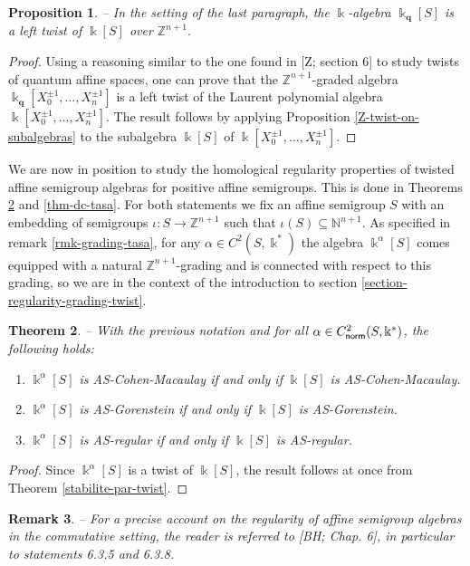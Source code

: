 \documentclass[twoside,11pt]{article}
\newcommand{\norm}{{\sf norm}}
\renewcommand{\k}{\Bbbk}
\newcommand{\N}{{\mathbb N}}
\newcommand{\Z}{{\mathbb Z}}
\newcommand{\q}{{\mathbf q}}
\newtheorem{subtheorem}{Theorem}[subsection]
\newtheorem{subproposition}[subtheorem]{Proposition}
\newtheorem{subremark}[subtheorem]{Remark}
\begin{document}
\begin{subproposition} -- \label{tasa-est-un-zt}
In the setting of the last paragraph, the $\k$-algebra $\k_\q[S]$ is a left twist of
$\k[S]$ over $\Z^{n+1}$.
\end{subproposition}

\begin{proof}  
Using a reasoning similar to the one found in [Z; section 6] to study twists of quantum
affine spaces, one can prove that the $\Z^{n+1}$-graded algebra $\k_\q[X_0^{\pm 1},
\ldots, X_n^{\pm 1}]$ is a left twist of the Laurent polynomial algebra $\k[X_0^{\pm 1},
\ldots, X_n^{\pm 1}]$. The result follows by applying Proposition
\ref{Z-twist-on-subalgebras} to the subalgebra $\k[S]$ of $\k[X_0^{\pm 1}, \ldots,
X_n^{\pm 1}]$. \end{proof}

We are now in position to study the homological regularity properties of twisted affine
semigroup algebras for positive affine semigroups. This is done in Theorems
\ref{thm-AS-tasa} and \ref{thm-dc-tasa}. For both statements we fix an affine semigroup
$S$ with an embedding of semigroups $\iota : S \longrightarrow \Z^{n+1}$ such that
$\iota(S) \subseteq \N^{n+1}$. As specified in remark \ref{rmk-grading-tasa}, for
any $\alpha\in C^2(S,\k^*)$ the algebra $\k^\alpha[S]$ comes equipped with a natural
$\Z^{n+1}$-grading and is connected with respect to this grading, so we are in the context
of the introduction to section \ref{section-regularity-grading-twist}.

\begin{subtheorem} -- \label{thm-AS-tasa} 
With the previous notation and for all $\alpha \in C^2_\norm(S,\k^*)$, the following
holds:
\begin{enumerate}
	\item $\k^\alpha[S]$ is AS-Cohen-Macaulay if and only if $\k[S]$ is
		AS-Cohen-Macaulay.
	\item $\k^\alpha[S]$ is AS-Gorenstein if and only if $\k[S]$ is AS-Gorenstein.
	\item $\k^\alpha[S]$ is AS-regular if and only if $\k[S]$ is AS-regular.
\end{enumerate}
\end{subtheorem}

\begin{proof} Since $\k^\alpha[S]$ is a twist of $\k[S]$, the result follows at once from
Theorem \ref{stabilite-par-twist}. \end{proof}

\begin{subremark} -- \rm 
For a precise account on the regularity of affine semigroup algebras in the commutative
setting, the reader is referred to [BH; Chap. 6], in particular to statements 6.3.5 and
6.3.8.
\end{subremark}
\end{document}
